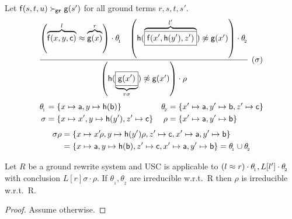    \begin{example}
    Let \( \mathsf{f}(s,t,u)\mathrel\succ_{\!\mathtt{gr}}\mathsf{g}(s') \) for all ground terms
   \( r,s,t,s' \).
   \begin{gather*}
       \infer[(\sigma)]{
           \left(
               \mh(\underbrace{
                   \boxed{\mg(x')}
                    }_{r\sigma})\mNE\mg(x')
               \right)\cdot\rho
        }{
           \left(
               \overbrace{\mf(x,y,\mc)}^{l}
               \mEQ
               \overbrace{\mg(x)}^r
           \right)\cdot \theta_{\!_1}
        & \left(
           \mh(\overbrace{
               \boxed{\mf(x',\mh(y'), z')}
                }^{l'})\mNE\mg(x')
           \right)\cdot \theta_{\!_2}
        }
   \end{gather*}
   \begin{align*}
       \theta_{\!_1} &= \{x\mapsto\mathsf{a}, y\mapsto\mathsf{h}(\mathsf{b})\} &
       \theta_{\!_2} &= \{x'\mapsto\mathsf{a}, y'\mapsto\mathsf{b}, z'\mapsto\mathsf{c} \}
        \\
        \sigma &= \{x\mapsto x',y\mapsto\mathsf{h}(y'),z'\mapsto\mathsf{c} \}
          &
        \rho &=\{ x'\mapsto \mathsf{a}, y'\mapsto \mathsf{b} \}
   \end{align*}
   \begin{align*}
   \sigma\rho &= \{
    x\mapsto x'\!\rho,y\mapsto\mathsf{h}(y')\rho,z'\mapsto\mathsf{c},
    x'\mapsto \mathsf{a}, y'\mapsto \mathsf{b}
    \}
    \\
    &= \{ x\mapsto \mathsf{a},y\mapsto\mathsf{h}(\mathsf{b}),z'\mapsto\mathsf{c},
    x'\mapsto \mathsf{a}, y'\mapsto \mathsf{b}
        \}
    = \theta_{\!_1}\cup\theta_{\!_2}
   \end{align*}
\end{example}


   \begin{lemma}
        Let \( R \) be a ground rewrite system and USC is applicable to
       \( (l\approx r)\cdot\theta_{\!_1}, L[l']\cdot\theta_{\!_2} \)
        with conclusion
       \( L[r]\sigma\cdot\rho \).
        If \( \theta_{\!_1}, \theta_{\!_2} \) are irreducible w.r.t.~R
        then \( \rho \) is irreducible w.r.t.~R.
   \end{lemma}

   \begin{proof}
        Assume otherwise.

   \end{proof}

